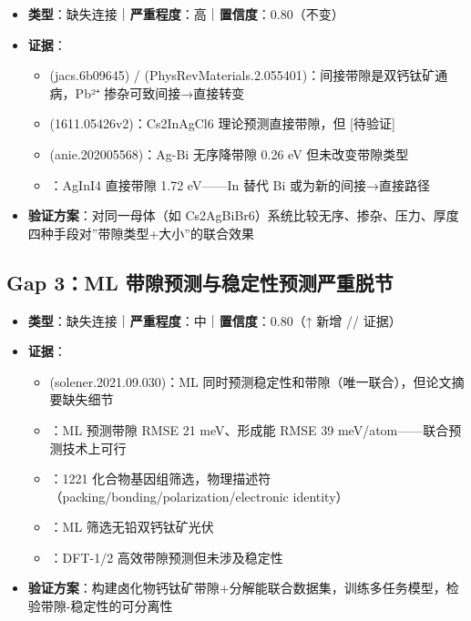 \documentclass[12pt,a4paper]{ctexart}
\providecommand{\tightlist}{%
  \setlength{\itemsep}{0pt}\setlength{\parskip}{0pt}}
\begin{document}
\begin{itemize}
\tightlist
\item
  \textbf{类型}：缺失连接｜\textbf{严重程度}：高｜\textbf{置信度}：0.80（不变）
\item
  \textbf{证据}：

  \begin{itemize}
  \tightlist
  \item
    \cite{p8} (jacs.6b09645) / \cite{p11} (PhysRevMaterials.2.055401)：间接带隙是双钙钛矿通病，Pb²⁺ 掺杂可致间接→直接转变
  \item
    \cite{p1} (1611.05426v2)：Cs2InAgCl6 理论预测直接带隙，但 {[}待验证{]}
  \item
    \cite{p14} (anie.202005568)：Ag-Bi 无序降带隙 0.26 eV 但未改变带隙类型
  \item
    \cite{p70}：AgInI4 直接带隙 1.72 eV------In 替代 Bi 或为新的间接→直接路径
  \end{itemize}
\item
  \textbf{验证方案}：对同一母体（如 Cs2AgBiBr6）系统比较无序、掺杂、压力、厚度四种手段对''带隙类型+大小''的联合效果
\end{itemize}

\subsection{Gap 3：ML 带隙预测与稳定性预测严重脱节}\label{gap:gap-3ml-ux5e26ux9699ux9884ux6d4bux4e0eux7a33ux5b9aux6027ux9884ux6d4bux4e25ux91cdux8131ux8282}

\begin{itemize}
\tightlist
\item
  \textbf{类型}：缺失连接｜\textbf{严重程度}：中｜\textbf{置信度}：0.80（↑ 新增 \cite{p60}/\cite{p64}/\cite{p65} 证据）
\item
  \textbf{证据}：

  \begin{itemize}
  \tightlist
  \item
    \cite{p19} (solener.2021.09.030)：ML 同时预测稳定性和带隙（唯一联合），但论文摘要缺失细节
  \item
    \cite{p60}：ML 预测带隙 RMSE 21 meV、形成能 RMSE 39 meV/atom------联合预测技术上可行
  \item
    \cite{p65}：1221 化合物基因组筛选，物理描述符（packing/bonding/polarization/electronic identity）
  \item
    \cite{p64}：ML 筛选无铅双钙钛矿光伏
  \item
    \cite{p2}：DFT-1/2 高效带隙预测但未涉及稳定性
  \end{itemize}
\item
  \textbf{验证方案}：构建卤化物钙钛矿带隙+分解能联合数据集，训练多任务模型，检验带隙-稳定性的可分离性
\end{itemize}
\end{document}
